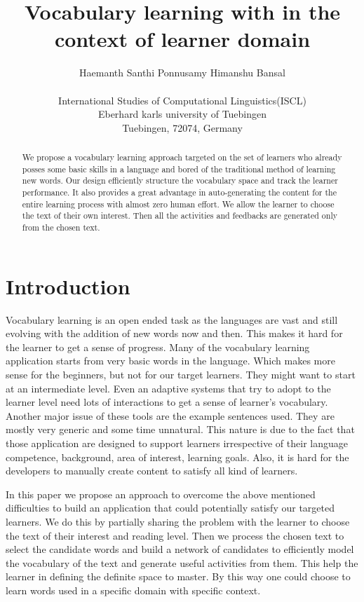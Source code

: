 \documentclass[11pt,a4paper]{article}
\title{Vocabulary learning with in the context of learner domain}
\author{Haemanth Santhi Ponnusamy \qquad Himanshu Bansal \\\\
  International Studies of Computational Linguistics(ISCL) \\
  Eberhard karls university of Tuebingen\\
  Tuebingen, 72074, Germany}
\date{}
\begin{document}
\maketitle
\begin{abstract}
  We propose a vocabulary learning approach targeted on the set of learners
  who already posses some basic skills in a language and bored of the
  traditional method of learning new words. Our design 
  efficiently structure the vocabulary space and track the learner performance.
  It also provides a great advantage in auto-generating the content
  for the entire learning process with almost zero human effort. We allow the
  learner to choose the text of their own interest. Then all the activities and
  feedbacks are generated only from the chosen text.
\end{abstract}

\section{Introduction}
Vocabulary learning is an open ended task as the languages are vast and still
evolving with the addition of new words now and then. This makes it hard for the
learner to get a sense of progress. Many of the vocabulary learning application 
starts from very basic words in the language. Which makes more sense for the 
beginners, but not for our target learners. They might want to start at an intermediate level.
Even an adaptive systems that try to adopt to the learner level need lots of interactions
to get a sense of learner's vocabulary. Another major issue of these tools are the
example sentences used. They are mostly very generic and some time unnatural.
This nature is due to the fact that those application are designed to support learners irrespective of their
language competence, background, area of interest, learning goals. Also, it is
hard for the developers to manually create content to satisfy all kind of learners.

In this paper we propose an approach to overcome the above mentioned
difficulties to build an application that could potentially satisfy our targeted
learners. We do this by partially sharing the problem with the learner to choose the 
text of their interest and reading level. Then we process the chosen text to
select the candidate words and build a network of candidates to efficiently model
the vocabulary of the text and generate useful activities from them. This help
the learner in defining the definite space to master. By this way one
could choose to learn words used in a specific domain with specific context.
\end{document}

